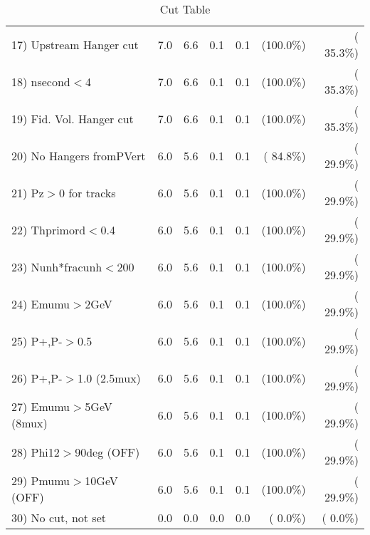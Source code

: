 \begin{table}[h!]
\begin{tabular}{||l||r|r|r|r|r|r||}
 17) Upstream Hanger cut  &          7.0 &          6.6 &          0.1 &          0.1 & (100.0\%) & ( 35.3\%) \\
 18) nsecond$<$4          &          7.0 &          6.6 &          0.1 &          0.1 & (100.0\%) & ( 35.3\%) \\
 19) Fid. Vol. Hanger cut &          7.0 &          6.6 &          0.1 &          0.1 & (100.0\%) & ( 35.3\%) \\
 20) No Hangers fromPVert &          6.0 &          5.6 &          0.1 &          0.1 & ( 84.8\%) & ( 29.9\%) \\
 21) Pz$>$0 for tracks    &          6.0 &          5.6 &          0.1 &          0.1 & (100.0\%) & ( 29.9\%) \\
 22) Thprimord$<$0.4      &          6.0 &          5.6 &          0.1 &          0.1 & (100.0\%) & ( 29.9\%) \\
 23) Nunh*fracunh$<$200   &          6.0 &          5.6 &          0.1 &          0.1 & (100.0\%) & ( 29.9\%) \\
 24) Emumu$>$2GeV         &          6.0 &          5.6 &          0.1 &          0.1 & (100.0\%) & ( 29.9\%) \\
 25) P+,P-$>$0.5          &          6.0 &          5.6 &          0.1 &          0.1 & (100.0\%) & ( 29.9\%) \\
 26) P+,P-$>$1.0 (2.5mux) &          6.0 &          5.6 &          0.1 &          0.1 & (100.0\%) & ( 29.9\%) \\
 27) Emumu$>$5GeV  (8mux) &          6.0 &          5.6 &          0.1 &          0.1 & (100.0\%) & ( 29.9\%) \\
 28) Phi12$>$90deg  (OFF) &          6.0 &          5.6 &          0.1 &          0.1 & (100.0\%) & ( 29.9\%) \\
 29) Pmumu$>$10GeV  (OFF) &          6.0 &          5.6 &          0.1 &          0.1 & (100.0\%) & ( 29.9\%) \\
 30) No cut, not set      &          0.0 &          0.0 &          0.0 &          0.0 & (  0.0\%) & (  0.0\%) \\
 \hline
 \hline
 \end{tabular}
 \caption{Cut Table           }
 \label{tab-cutheavy_neutrino_2.000}
 \end{table}
